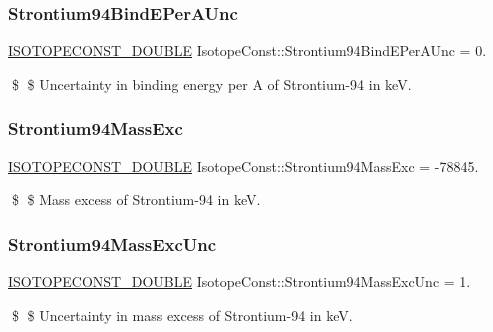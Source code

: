 \subsubsection{\texorpdfstring{Strontium94\+Bind\+E\+Per\+A\+Unc}{Strontium94BindEPerAUnc}}
{\footnotesize\ttfamily \mbox{\hyperlink{group___isotope_const-_macros_ga8f45a7272ce02c0b4c65c44636ed719a}{I\+S\+O\+T\+O\+P\+E\+C\+O\+N\+S\+T\+\_\+\+D\+O\+U\+B\+LE}} Isotope\+Const\+::\+Strontium94\+Bind\+E\+Per\+A\+Unc = 0.}

\$ \$ Uncertainty in binding energy per A of Strontium-\/94 in keV. \mbox{\label{group___isotope_const-_strontium-_sr94_gab89b02496bd6871b942fd2895833c54d}} 
\subsubsection{\texorpdfstring{Strontium94\+Mass\+Exc}{Strontium94MassExc}}
{\footnotesize\ttfamily \mbox{\hyperlink{group___isotope_const-_macros_ga8f45a7272ce02c0b4c65c44636ed719a}{I\+S\+O\+T\+O\+P\+E\+C\+O\+N\+S\+T\+\_\+\+D\+O\+U\+B\+LE}} Isotope\+Const\+::\+Strontium94\+Mass\+Exc = -\/78845.}

\$ \$ Mass excess of Strontium-\/94 in keV. \mbox{\label{group___isotope_const-_strontium-_sr94_ga76305d1f298f6e88b1bca3026f5dce94}} 
\subsubsection{\texorpdfstring{Strontium94\+Mass\+Exc\+Unc}{Strontium94MassExcUnc}}
{\footnotesize\ttfamily \mbox{\hyperlink{group___isotope_const-_macros_ga8f45a7272ce02c0b4c65c44636ed719a}{I\+S\+O\+T\+O\+P\+E\+C\+O\+N\+S\+T\+\_\+\+D\+O\+U\+B\+LE}} Isotope\+Const\+::\+Strontium94\+Mass\+Exc\+Unc = 1.}

\$ \$ Uncertainty in mass excess of Strontium-\/94 in keV. \mbox{\label{group___isotope_const-_strontium-_sr94_ga6340e1a605e84e2d3577f1f16425f737}} 

